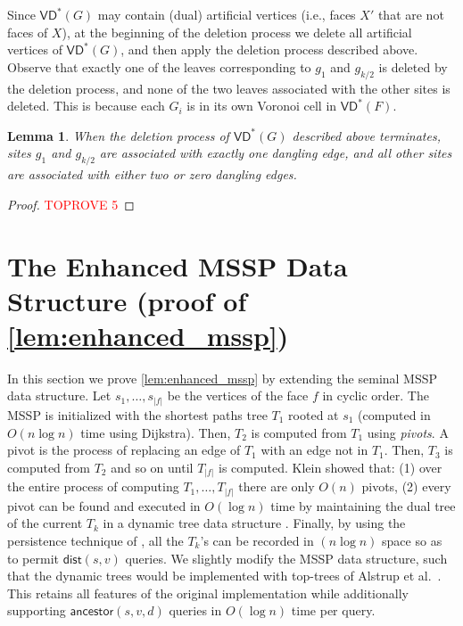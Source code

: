 \documentclass{article}
\newcommand{\dist}{\mathsf{dist}}
\newcommand{\ancestor}{\mathsf{ancestor}}
\newcommand{\VD}{\textsf{VD}}
\newcommand{\X}{X}
\newtheorem{lemma}{Lemma}
\begin{document}
Since $\VD^*(G)$ may contain (dual) artificial vertices (i.e., faces $\X'$ that are not faces of $\X$), at the beginning of the deletion process we delete all artificial vertices of $\VD^*(G)$, and then apply the deletion process described above.
Observe that exactly one of the leaves corresponding to $g_1$ and $g_{k/2}$ is deleted by the deletion process, and none of the two leaves associated with the other sites is deleted. This is because each $G_i$ is in its own Voronoi cell in $\VD^*(F)$.




\begin{lemma}\label{lem:unique_connected_components}
When the deletion process of $\VD^*(G)$ described above terminates, sites $g_1$ and $g_{k/2}$ are associated with exactly one dangling edge, and all other sites are associated with either two or zero dangling edges.
\end{lemma}

\begin{proof}\textcolor{red}{TOPROVE 5}\end{proof}







\appendix
\section{The Enhanced MSSP Data Structure (proof of \cref{lem:enhanced_mssp})}\label{sec:enhanced_mssp}


In this section we prove \cref{lem:enhanced_mssp} by extending the seminal MSSP data structure\cite{Klein02,CabelloCE13}.
Let $s_1,\ldots,s_{|f|}$ be the vertices of the face $f$ in cyclic order.
The MSSP is initialized with the shortest paths tree $T_1$ rooted at $s_1$ (computed in $O(n\log n)$ time using Dijkstra). Then, $T_2$ is computed from $T_1$ using {\em pivots}. A pivot is the process of replacing an edge of $T_1$ with an edge not in $T_1$.
Then, $T_3$ is computed from $T_2$ and so on until $T_{|f|}$ is computed.
Klein showed that: (1) over the entire process of computing $T_1,\ldots,T_{|f|}$ there are only $O(n)$ pivots, (2) every pivot can be found and executed in $O(\log n)$ time by maintaining the dual tree of the current $T_k$ in a dynamic tree data structure \cite{SleatorT83}.
Finally, by using the persistence technique of \cite{DriscollSST89}, all the $T_k$'s can be recorded in $(n \log n)$ space so as to permit $\dist(s,v)$ queries.
We slightly modify the MSSP data structure, such that the dynamic trees would be implemented with top-trees of Alstrup et al.~\cite{AHLT05}.
This retains all features of the original implementation while additionally supporting $\ancestor(s,v,d)$ queries in  $O(\log n)$ time per query.
\end{document}

